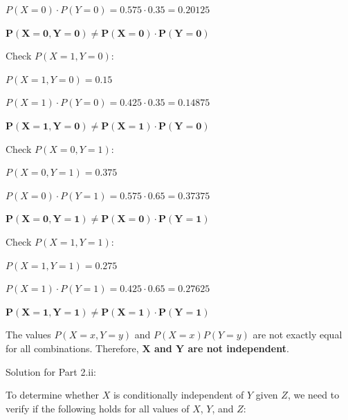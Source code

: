 \documentclass[12pt,letterpaper, onecolumn]{exam}
\begin{document}
\begin{questions}
\begin{parts}
\begin{subparts}
\begin{solution}
\begin{center}
                    $P(X=0) \cdot P(Y=0) = 0.575 \cdot 0.35 = 0.20125$

                    $\boldsymbol{P(X=0,Y=0) \neq P(X=0) \cdot P(Y=0)}$
                \end{center}

                Check $P(X=1,Y=0)$:

                \begin{center}
                    $P(X=1,Y=0) = 0.15$

                    $P(X=1) \cdot P(Y=0) = 0.425 \cdot 0.35 = 0.14875$

                    $\boldsymbol{P(X=1,Y=0) \neq P(X=1) \cdot P(Y=0)}$
                \end{center}

                Check $P(X=0,Y=1)$:

                \begin{center}
                    $P(X=0,Y=1) = 0.375$

                    $P(X=0) \cdot P(Y=1) = 0.575 \cdot 0.65 = 0.37375$

                    $\boldsymbol{P(X=0,Y=1) \neq P(X=0) \cdot P(Y=1)}$
                \end{center}

                Check $P(X=1,Y=1)$:

                \begin{center}
                    $P(X=1,Y=1) = 0.275$

                    $P(X=1) \cdot P(Y=1) = 0.425 \cdot 0.65 = 0.27625$

                    $\boldsymbol{P(X=1,Y=1) \neq P(X=1) \cdot P(Y=1)}$
                \end{center}

                The values $P(X=x,Y=y)$ and $P(X=x)P(Y=y)$ are not exactly equal for all combinations. 
                Therefore, \textbf{$\boldsymbol{X}$ and $\textbf{Y}$ are not independent}.
                
            \end{solution}

            \pagebreak

            \subpart[5] Solution for Part 2.ii:
    
            \begin{solution}

                To determine whether $X$ is conditionally independent of $Y$ given 
                $Z$, we need to verify if the following holds for all values of 
                $X$, $Y$, and $Z$:
                

\end{solution}
\end{subparts}
\end{parts}
\end{questions}
\end{document}
